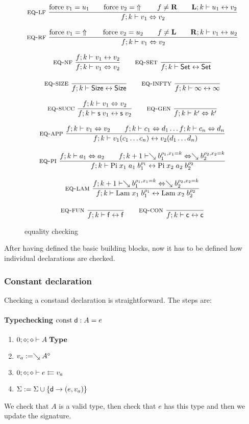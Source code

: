 \begin{figure}[p]
\begin{gather*}
\nru{\eqlf}
{\forc \; v_1 = u_1 \qquad \forc \; v_2 = \stuck 
\qquad
f \neq \rF \qquad \FeqVal{\lF}{k}{u_1}{v_2}}
{ \EqVal{f}{k}{v_1}{v_2}}
\\[2ex]
\nru{\eqrf}
{\forc \; v_1 = \stuck \qquad \forc \; v_2 = u_2 
\qquad
f \neq \lF \qquad \FeqVal{\rF}{k}{v_1}{u_2}}
{ \EqVal{f}{k}{v_1}{v_2}}
\\[2ex]
\nru{\eqnf}
{\FeqVal{f}{k}{v_1}{v_2}}
{ \EqVal{f}{k}{v_1}{v_2}}
\qquad
\nru{\eqset}
{}
{\FeqVal{f}{k}{\Set}{\Set}}
\\[2ex]
\nru{\eqsize}
{}
{\FeqVal{f}{k}{\Size}{\Size}}
\qquad
\nru{\eqinfty}
{}
{\FeqVal{f}{k}{\infty}{\infty}}
\\[2ex]
\nru{\eqsuc}
{\EqVal{f}{k}{v_1}{v_2}}
{\FeqVal{f}{k}{\s v_1}{\s v_2}}
\qquad
\nru{\eqgen}
{}
{\EqVal{f}{k}{k'}{k'}}
\\[2ex]
\nru{\eqapp}
{\EqVal{f}{k}{v_1}{v_2} \qquad
\EqVal{f}{k}{c_1}{d_1} \ldots \EqVal{f}{k}{c_n}{d_n}}
{\FeqVal{f}{k}{v_1 (c_1 \ldots c_n)}{v_2 (d_1 \ldots d_n)}}
\\[2ex]
\nru{\eqpi}
{\EqVal{f}{k}{a_1}{a_2}
\qquad
\EqVal{f}{k+1}{\wh \cl{b_1}{\ins{\rho_1}{x_1}{k}}}{\wh \cl{b_2}{\ins{\rho_2}{x_2}{k}}}}
{\FeqVal{f}{k}{\vpi \; x_1 \; a_1 \; \cl{b_1}{\rho_1}}{\vpi \; x_2 \; a_2 \; \cl{b_2}{\rho_2}}}
\\[2ex]
\nru{\eqlam}
{\EqVal{f}{k+1}{\wh \cl{b_1}{\ins{\rho_1}{x_1}{k}}}{\wh \cl{b_2}{\ins{\rho_2}{x_2}{k}}}}
{\FeqVal{f}{k}{\vlam \; x_1 \; \cl{b_1}{\rho_1}}{\vlam \; x_2 \; \cl{b_2}{\rho_2}}}
\\[2ex]
\nru{\eqdef}
{}
{\FeqVal{f}{k}{\ff}{\ff}}
\qquad
\nru{\eqcon}
{}
{\FeqVal{f}{k}{\cc}{\cc}}
\end{gather*}
\caption{equality checking}
\end{figure}

After having defined the basic building blocks, now it has to be defined how individual declarations are checked.
\subsubsection{Constant declaration}
Checking a constand declaration is straightforward.
The steps are:
\paragraph*{Typechecking $\const \dd : A = e $}
\begin{enumerate}
\item
$\IsType{0}{\diamond}{\diamond}{A}$
\item
$ v_a := \wh \cl{A}{\diamond}$
\item
$\Check{0}{\diamond}{\diamond}{e}{v_a}$
\item
$\Sig := \Sig \cup \{\dd \ra (e,v_a)\}$
\end{enumerate}
We check that $A$ is a valid type, then check that $e$ has this type and then we update the signature.
